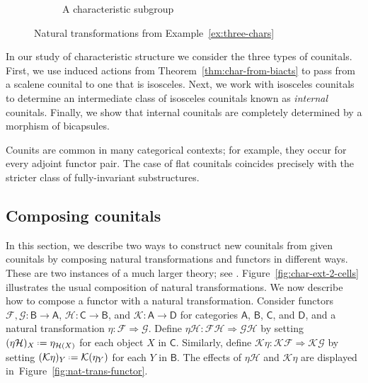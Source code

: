 \documentclass{amsart}
\newcommand{\Cat}[1]{\mathsf{#1}}
\newcommand{\cat}[1]{\Cat{#1}}
\newcommand{\acat}[1]{\mathsf{#1}}
\numberwithin{lstfloat}{section}
\newcommand{\defeq}{\mathrel{\hstretch{.13}{=}\hspace{.2ex}{=}}}
\newcommand{\func}[1]{\mathcal{#1}}
\theoremstyle{definition}
\theoremstyle{remark}
\numberwithin{equation}{section}
\begin{document}
\begin{figure}[!htbp]
\begin{subfigure}[t]{0.33\textwidth}
    \caption{A characteristic subgroup}
    \label{fig:single-counital}
    \end{subfigure}  
	\caption{Natural transformations from Example~\ref{ex:three-chars}}
	\label{fig:counital}
\end{figure}


In our study of characteristic structure we consider the three types of
counitals.  First, we use  induced actions from Theorem~\ref{thm:char-from-biacts} to
pass from a scalene counital to one that is isosceles.  Next, we work with
isosceles counitals to determine an intermediate class of isosceles counitals
known as \emph{internal} counitals.  Finally, we show that internal counitals
are completely determined by a morphism of bicapsules.

Counits are common in many categorical contexts; for example, they occur for
every adjoint functor pair.  The case of flat counitals coincides precisely with
the stricter class of fully-invariant substructures.  


\subsection{Composing counitals}

In this section, we describe two ways to construct new counitals from given
counitals by composing natural transformations and functors in different ways. These are two instances of a much larger theory; see \cite{Baez, Power}. Figure~\ref{fig:char-ext-2-cells} illustrates the usual composition
of natural transformations. We now  describe how to compose a functor with a
natural transformation. Consider functors $\func{F},\func{G}:\cat{B}\to
\cat{A}$, $\func{H}:\cat{C}\to\cat{B}$, and $\func{K}:\cat{A}\to \cat{D}$ for
categories $\cat{A}$, $\cat{B}$, $\cat{C}$, and $\acat{D}$, and a natural
transformation $\eta : \func{F} \Rightarrow \func{G}$. Define $\eta
\func{H}:\func{F}\func{H}\Rightarrow \func{G}\func{H}$ by setting $(\eta
\func{H})_X\defeq \eta_{\func{H}(X)}$ for each object $X$ in $\cat{C}$.
Similarly, define $\func{K}\eta:\func{K}\func{F}\Rightarrow \func{K}\func{G}$ by
setting $(\func{K}\eta)_Y\defeq\func{K}(\eta_Y)$ for each $Y$ in $\cat{B}$. The
effects of $\eta \func{H}$ and $\func{K}\eta$ are displayed
in~Figure~\ref{fig:nat-trans-functor}.
\end{document}
